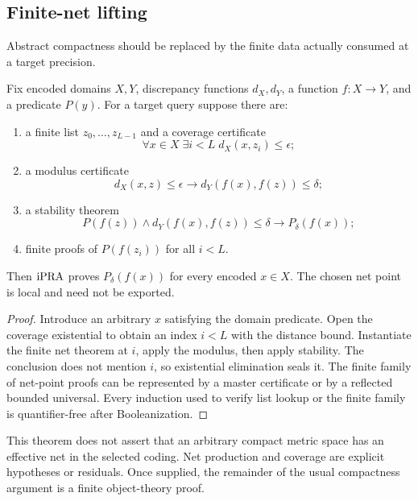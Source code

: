 \subsection{Finite-net lifting}

Abstract compactness should be replaced by the finite data actually consumed
at a target precision.

\begin{theorem}
\label{thm:net}
Fix encoded domains \(X,Y\), discrepancy functions \(d_X,d_Y\), a function
\(f:X\to Y\), and a predicate \(P(y)\).  For a target query suppose there are:

\begin{enumerate}
\item a finite list \(z_0,\ldots,z_{L-1}\) and a coverage certificate
\[
       \forall x\in X\;\exists i<L\;d_X(x,z_i)\le\epsilon;
\]
\item a modulus certificate
\[
       d_X(x,z)\le\epsilon\longrightarrow
       d_Y(f(x),f(z))\le\delta;
\]
\item a stability theorem
\[
       P(f(z))\wedge d_Y(f(x),f(z))\le\delta
       \longrightarrow P_\delta(f(x));
\]
\item finite proofs of \(P(f(z_i))\) for all \(i<L\).
\end{enumerate}

Then \(\mathrm{iPRA}\) proves \(P_\delta(f(x))\) for every encoded \(x\in X\).
The chosen net point is local and need not be exported.
\end{theorem}

\begin{proof}
Introduce an arbitrary \(x\) satisfying the domain predicate.  Open the
coverage existential to obtain an index \(i<L\) with the distance bound.
Instantiate the finite net theorem at \(i\), apply the modulus, then apply
stability.  The conclusion does not mention \(i\), so existential elimination
seals it.  The finite family of net-point proofs can be represented by a
master certificate or by a reflected bounded universal.  Every induction used
to verify list lookup or the finite family is quantifier-free after
Booleanization.
\end{proof}

\begin{remark}
This theorem does not assert that an arbitrary compact metric space has an
effective net in the selected coding.  Net production and coverage are
explicit hypotheses or residuals.  Once supplied, the remainder of the usual
compactness argument is a finite object-theory proof.
\end{remark}

